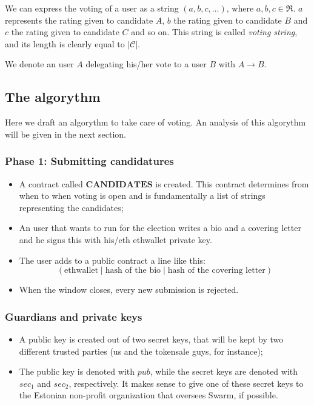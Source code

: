 \documentclass[submission, copyright,creativecommons,sharealike,noncommercial]{eptcs}
\newcommand{\candidates}{\ensuremath{\mathcal{C}} \xspace}
\newcommand{\range}{\ensuremath{\mathfrak{R}}\xspace}
\begin{document}
	\begin{definition}\label{voting string}		
		We can express the voting of a user as a string $(a,b,c, \dots)$, where $a,b,c \in \range$. $a$ represents the rating given to candidate $A$, $b$ the rating given to candidate $B$ and $c$ the rating given to candidate $C$ and so on. This string is called \emph{voting string}, and its length is clearly equal to $|\candidates|$.
	\end{definition}
	\begin{definition}
 		We denote an user $A$ delegating his/her vote to a user $B$ with $A \to B$.
	\end{definition}
	
	\subsection{The algorythm}
		Here we draft an algorythm to take care of voting. An analysis of this algorythm will be given in the next section.
		\subsubsection{Phase 1: Submitting candidatures}
		
		\begin{itemize}
			\item A contract called $\textbf{CANDIDATES}$ is created. This contract determines from when to when voting is open and is fundamentally a list of strings representing the candidates;
			
			\item An user that wants to run for the election writes a bio and a covering letter and he signs this with his/eth ethwallet private key.
			
			\item The user adds to a public contract a line like this:
			\[
			(\text{ethwallet} \mid \text{hash of the bio} \mid \text{hash of the covering letter})
			\]
			
			\item When the window closes, every new submission is rejected. 
		\end{itemize}
		
		\subsubsection{Guardians and private keys}
			\begin{itemize}
				\item A public key is created out of two secret keys, that will be kept by two different trusted parties (us and the tokensale guys, for instance);
				
				\item The public key is denoted with $pub$, while the secret keys are denoted with $sec_1$ and $sec_2$, respectively. It makes sense to give one of these secret keys to the Estonian non-profit organization that oversees Swarm, if possible.
				
			\end{itemize}
\end{document}
